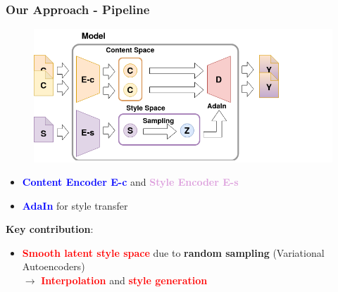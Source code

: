 \documentclass[11pt,xcolor=dvipsnames]{beamer}
\begin{document}
\begin{frame}
\frametitle{Our Approach - Pipeline}
\begin{figure}
\centering
\includegraphics[scale=0.3]{pipelinemodel2.png}
\end{figure}


\begin{itemize}
	\item \textcolor{blue}{\textbf{Content Encoder E-c}} and \textcolor{Plum}{\textbf{Style Encoder E-s}}
	\item \textcolor{blue}{\textbf{AdaIn}} for style transfer
\end{itemize}

\textbf{Key contribution}:
\begin{itemize}

	\item \textcolor{red}{\textbf{Smooth latent style space}} due to \textbf{random sampling} (Variational Autoencoders)
	\\ $\rightarrow$ \textbf{\textcolor{red}{Interpolation}} and \textbf{\textcolor{red}{style generation}}
\end{itemize}

\end{frame}
\end{document}
